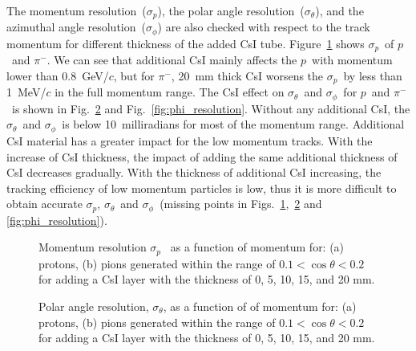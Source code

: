 \documentclass[aps,preprint,showkeys,superscriptaddress]{revtex4}
\newcommand{\pp}{$p$}
\newcommand{\pim}{$\pi^-$}
\newcommand{\pres}{$\sigma_p$}
\newcommand{\tres}{$\sigma_\theta$}
\newcommand{\phires}{$\sigma_\phi$}
\begin{document}
The momentum resolution~(\pres), the polar angle resolution~(\tres), and the
azimuthal angle resolution~(\phires) are also checked with respect to the track
momentum for different thickness of the added CsI tube.
Figure~\ref{fig:p_resolution} shows \pres\ of \pp\ and \pim. We can see that
additional CsI mainly affects the \pp\ with momentum lower than 0.8~GeV/$c$,
but for \pim, 20~mm thick CsI worsens the \pres\ by less than 1~MeV/$c$ in the
full momentum range. The CsI effect on \tres\ and \phires\ for \pp\ and \pim\
is shown in Fig.~\ref{fig:t_resolution} and Fig.~\ref{fig:phi_resolution}.
Without any additional CsI, the \tres\ and \phires\ is below 10~milliradians for
most of the momentum range.  Additional CsI material has a greater impact for
the low momentum tracks. With the increase of CsI thickness, the impact of
adding the same additional thickness of CsI decreases gradually.  With the
thickness of additional CsI increasing, the tracking efficiency of low momentum
particles is low, thus it is more difficult to obtain accurate \pres, \tres\
and \phires\ (missing points in
Figs.~\ref{fig:p_resolution},~\ref{fig:t_resolution} and
\ref{fig:phi_resolution}).
        
        \begin{figure}[htbp]
        	\centering  %
        	\subfigbottomskip=2pt %
        	\subfigcapskip=-5pt %
        	\caption{Momentum resolution \pres~ as a function of momentum for: (a) protons, (b) pions generated within the range of $0.1 < \cos\theta < 0.2$ for adding a CsI layer with the thickness of 0, 5, 10, 15, and 20 mm.}
        	\label{fig:p_resolution}
        \end{figure}

        \begin{figure}[htbp]
        	\centering  %
        	\subfigbottomskip=2pt %
        	\subfigcapskip=-5pt %
        	\caption{Polar angle resolution, \tres, as a function of of momentum for: (a) protons, (b) pions generated within the range of $0.1 < \cos\theta < 0.2$ for adding a CsI layer with the thickness of 0, 5, 10, 15, and 20 mm. }
        	\label{fig:t_resolution}
        \end{figure}
        
\end{document}
